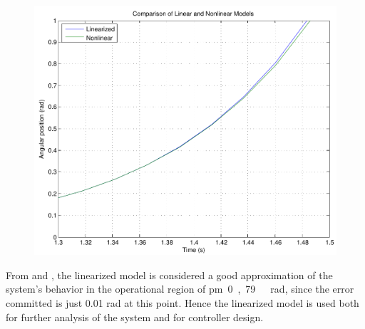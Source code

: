 \begin{minipage}{\linewidth}
\begin{minipage}{0.45\linewidth}
\begin{figure}[H]
			\includegraphics[scale=.4]{figures/LinearizedVSNonlinearZoom}
			\centering
			\vspace{-.1cm}
			\captionsetup{justification=centering}
			\label{LinearizedVSNonlinearZoom}
		\end{figure}\vspace{-5mm}
	\end{minipage}
\end{minipage}

From  and , the linearized model is considered a good approximation of the system's behavior in the operational region of \si{\pm 0,79\ rad}, since the error committed is just 0.01 rad at this point. Hence the linearized model is used both for further analysis of the system and for controller design.
